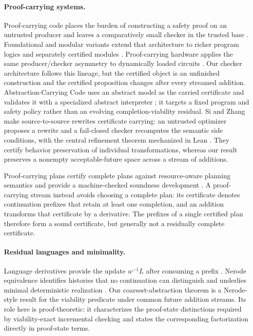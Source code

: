 \documentclass[11pt]{article}
\theoremstyle{definition}
\begin{document}
\paragraph{Proof-carrying systems.}
Proof-carrying code places the burden of constructing a safety proof on an untrusted producer and leaves a comparatively small checker in the trusted base \cite{necula1997}. Foundational and modular variants extend that architecture to richer program logics and separately certified modules \cite{feng2007fpcc}. Proof-carrying hardware applies the same producer/checker asymmetry to dynamically loaded circuits \cite{drzevitzky2010pch}. Our checker architecture follows this lineage, but the certified object is an unfinished construction and the certified proposition changes after every streamed addition. Abstraction-Carrying Code uses an abstract model as the carried certificate and validates it with a specialized abstract interpreter \cite{albert2005acc}; it targets a fixed program and safety policy rather than an evolving completion-viability residual. Si and Zhang make source-to-source rewrites certificate carrying: an untrusted optimizer proposes a rewrite and a fail-closed checker recomputes the semantic side conditions, with the central refinement theorem mechanized in Lean \cite{si2026cct}. They certify behavior preservation of individual transformations, whereas our result preserves a nonempty acceptable-future space across a stream of additions.

Proof-carrying plans certify complete plans against resource-aware planning semantics and provide a machine-checked soundness development \cite{hill2020pcp}. A proof-carrying stream instead avoids choosing a complete plan: its certificate denotes continuation prefixes that retain at least one completion, and an addition transforms that certificate by a derivative. The prefixes of a single certified plan therefore form a sound certificate, but generally not a residually complete certificate.

\paragraph{Residual languages and minimality.}
Language derivatives provide the update $w^{-1}L$ after consuming a prefix \cite{brzozowski1964}. Nerode equivalence identifies histories that no continuation can distinguish and underlies minimal deterministic realization \cite{nerode1958}. Our coarsest-abstraction theorem is a Nerode-style result for the viability predicate under common future addition streams. Its role here is proof-theoretic: it characterizes the proof-state distinctions required by viability-exact incremental checking and states the corresponding factorization directly in proof-state terms.
\end{document}
